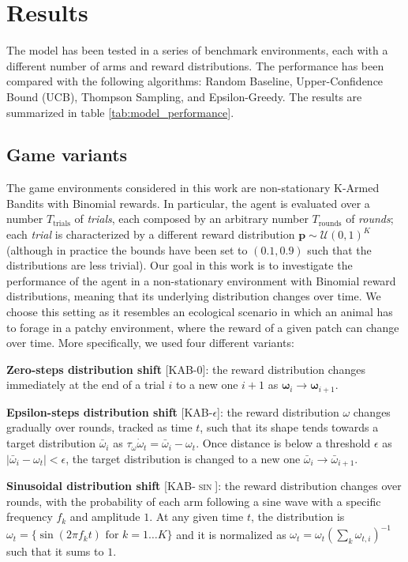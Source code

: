 \section{Results}

The model has been tested in a series of benchmark environments, each with a different number of arms and reward distributions. The performance has been compared with the following algorithms: Random Baseline, Upper-Confidence Bound (UCB), Thompson Sampling, and Epsilon-Greedy. The results are summarized in table \ref{tab:model_performance}.

\subsection{Game variants}
\noindent The game environments considered in this work are non-stationary K-Armed Bandits with Binomial rewards. In particular, the agent is evaluated over a number $T_{\text{trials}}$ of \textit{trials}, each composed by an arbitrary number $T_{\text{rounds}}$ of \textit{rounds}; each \textit{trial} is characterized by a different reward distribution $\mathbf{p}\sim\mathcal{U}(0,1)^{K}$ (although in practice the bounds have been set to $(0.1, 0.9)$ such that the distributions are less trivial). Our goal in this work is to investigate the performance of the agent in a non-stationary environment with Binomial reward distributions, meaning that its underlying distribution changes over time.
We choose this setting as it resembles an ecological scenario in which an animal has to forage in a patchy environment, where the reward of a given patch can change over time.
More specifically, we used four different variants:

\noindent \textbf{Zero-steps distribution shift} [\textsc{KAB-0}]: the reward distribution changes immediately at the end of a trial $i$ to a new one $i+1$ as $\mathbf{\omega}_{i} \to \mathbf{\omega}_{i+1}$. 

\noindent \textbf{Epsilon-steps distribution shift} [\textsc{KAB-$\epsilon$}]: the reward distribution $\omega$ changes gradually over rounds, tracked as time $t$, such that its shape tends towards a target distribution $\bar{\omega}_{i}$ as
$\tau_{\omega}\dot{\omega}_{t}=\bar{\omega}_{i}-\omega_{t}$. Once distance is below a threshold $\epsilon$ as $\vert \bar{\omega}_{i} - \omega_{t}\vert < \epsilon$, the target distribution is changed to a new one $\bar{\omega}_{i}\to\bar{\omega}_{i+1}$.

\noindent \textbf{Sinusoidal distribution shift} [\textsc{KAB-$\sin$}]: the reward distribution changes over rounds, with the probability of each arm following a sine wave with a specific frequency $f_{k}$ and amplitude $1$. At any given time $t$, the distribution is $\omega_{t}=\{\sin(2\pi f_{k}
t)\text{  for }k=1\ldots K\}$ and it is
normalized as $\omega_{t} = \omega_{t}(\sum_{k} \omega_{t,i})^{-1}$ such that it sums to $1$.

